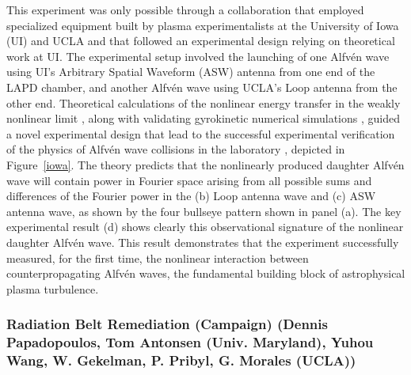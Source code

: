 \documentclass[11pt]{article}
\newcommand\Alfven{Alfv\'en }
\renewcommand{\cite}{\citep}
\begin{document}
This experiment was only possible through a collaboration that
employed specialized equipment built by plasma experimentalists at the
University of Iowa (UI) and UCLA and that followed an experimental
design relying on theoretical work at UI.  The experimental setup
involved the launching of one \Alfven wave using UI's Arbitrary
Spatial Waveform (ASW) antenna \citep{Thuecks:2009,Kletzing:2010} from
one end of the LAPD chamber, and another \Alfven wave using UCLA's
Loop antenna \citep{auerbach:2011} from the other end. Theoretical
calculations of the nonlinear energy transfer in the weakly nonlinear
limit \cite{Howes:2013a}, along with validating gyrokinetic numerical
simulations \cite{Nielson:2013a}, guided a novel experimental design
\cite{Howes:2013b} that lead to the successful experimental
verification of the physics of \Alfven wave collisions in the
laboratory \cite{Howes:2012b,Drake:2013}, depicted in Figure~\ref{iowa}. The
theory predicts that the nonlinearly produced daughter \Alfven wave
will contain power in Fourier space arising from all possible sums and
differences of the Fourier power in the (b) Loop antenna wave and (c)
ASW antenna wave, as shown by the four bullseye pattern shown in panel
(a). The key experimental result (d) shows clearly this observational
signature of the nonlinear daughter \Alfven wave.  This result
demonstrates that the experiment successfully measured, for the first
time, the nonlinear interaction between counterpropagating \Alfven
waves, the fundamental building block of astrophysical plasma
turbulence.



\subsubsection{Radiation Belt Remediation (Campaign) (Dennis Papadopoulos, Tom
Antonsen (Univ. Maryland), Yuhou Wang, W. Gekelman, P. Pribyl, G.
Morales (UCLA))}
\end{document}
